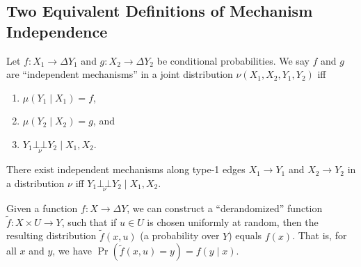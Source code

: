 \documentclass{article}
\newcommand{\CI}{\mathbin{\bot\!\!\!\bot}}
\begin{document}
    
    \subsection*{Two Equivalent Definitions of Mechanism Independence}
    
    \begin{defn}
        Let $f : X_1 \to \Delta Y_1$ and $g : X_2 \to \Delta Y_2$ be conditional probabilities.
        We say $f$ and $g$ are ``independent mechanisms'' in a joint distribution $\nu(X_1, X_2, Y_1, Y_2)$ iff
        \begin{enumerate}[nosep]
        \item $\mu(Y_1 \mid X_1) = f$,
        \item $\mu(Y_2 \mid X_2) = g$, and
        \item $\displaystyle Y_1 \underset\nu{\CI} Y_2 \mid X_1, X_2$.
            \qedhere
        \end{enumerate}        
    \end{defn}
    
    \begin{prop}
        There exist independent mechanisms along type-1 edges  $X_1 \to Y_1$ and $X_2 \to Y_2$ in a distribution $\nu$ iff  
        $\displaystyle Y_1 \underset\nu{\CI} Y_2 \mid X_1, X_2$.
    \end{prop}
    
    \begin{claim}
        Given a function $f : X \to \Delta Y$, we can construct a ``derandomized'' function $\tilde f : X \times U \to Y$,
        such that if $u \in U$ is chosen uniformly at random, then
        the resulting distribution $\tilde f(x, u)$ (a probability over $Y$) equals $f(x)$.
        That is, for all $x$ and $y$, we have $\Pr(\tilde f(x,u) = y) = f(y \mid x)$.
    \end{claim}   
    
\end{document}
